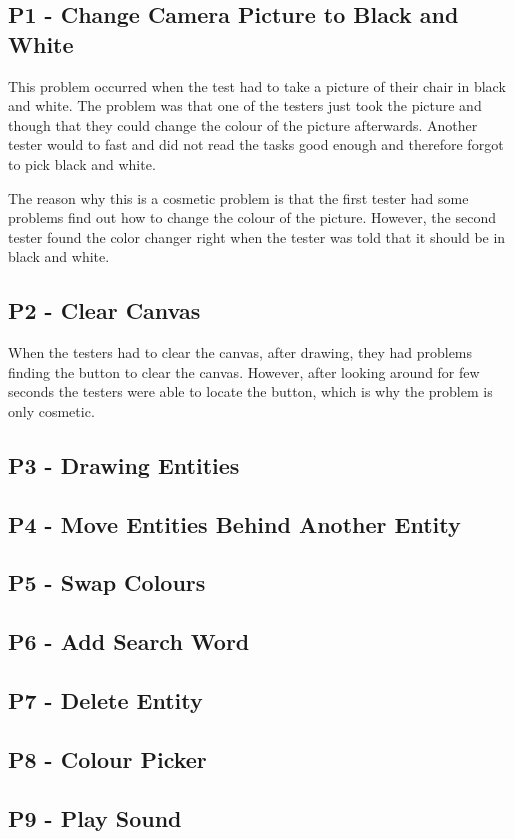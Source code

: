 \subsection*{P1 - Change Camera Picture to Black and White}
This problem occurred when the test had to take a picture of their chair in black and white.
The problem was that one of the testers just took the picture and though that they could change the colour of the picture afterwards.
Another tester would to fast and did not read the tasks good enough and therefore forgot to pick black and white.

The reason why this is a cosmetic problem is that the first tester had some problems find out how to change the colour of the picture.
However, the second tester found the color changer right when the tester was told that it should be in black and white.

\subsection*{P2 - Clear Canvas}
When the testers had to clear the canvas, after drawing, they had problems finding the button to clear the canvas.
However, after looking around for few seconds the testers were able to locate the button, which is why the problem is only cosmetic.

\subsection*{P3 - Drawing Entities}


\subsection*{P4 - Move Entities Behind Another Entity}

\subsection*{P5 - Swap Colours}

\subsection*{P6 - Add Search Word}

\subsection*{P7 - Delete Entity}

\subsection*{P8 - Colour Picker}

\subsection*{P9 - Play Sound}

